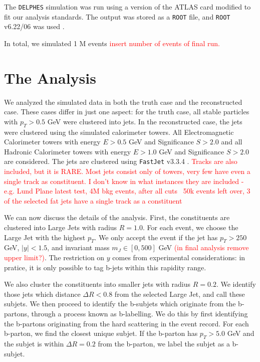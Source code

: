 \documentclass[10pt,a4paper]{book}
\newcommand\todo[1]{\textcolor{red}{#1}}
\def\code#1{\texttt{#1}}
\begin{document}
The \code{DELPHES} simulation was run using a version of the ATLAS card modified to fit our analysis standards. The output was stored as a \code{ROOT} file, and \code{ROOT} v6.22/06 was used \cite{fons_rademakers_2020_3895852}. 

In total, we simulated 1 M events \todo{insert number of events of final run.}


\section{The Analysis}

We analyzed the simulated data in both the truth case and the reconstructed case. These cases differ in just one aspect: for the truth case, all stable particles with $p_T > 0.5$ GeV were clustered into jets. In the reconstructed case, the jets were clustered using the simulated calorimeter towers. All Electromagnetic Calorimeter towers with energy $E > 0.5$ GeV and Significance $S > 2.0$ and all Hadronic Calorimeter towers with energy $E > 1.0$ GeV and Significance $S > 2.0$ are considered. The jets are clustered using \code{FastJet} v3.3.4 \cite{Cacciari:2011ma}.
\todo{Tracks are also included, but it is RARE. Most jets consist only of towers, very few have even a single track as constituent. I don't know in what instances they are included - e.g. Lund Plane latest test, 4M bkg events, after all cuts ~50k events left over, 3 of the selected fat jets have a single track as a constituent}

We can now discuss the details of the analysis. First, the constituents are clustered into Large Jets with radius $R=1.0$.  For  each  event,  we  choose  the  Large  Jet  with  the highest $p_T$. We only accept the event if the jet has $p_T > 250$ GeV, $\vert y \vert < 1.5$, and invariant mass $m_J \in [0,500]$ GeV \todo{(in final analysis remove upper limit?)}. The restriction on $y$ comes from experimental considerations: in pratice, it is only possible to tag b-jets within this rapidity range.

We  also  cluster  the  constituents  into  smaller  jets with radius $R = 0.2$. We identify those jets which distance $\Delta R < 0.8$ from the selected Large Jet, and call these subjets. We then proceed to identify the b-subjets which originate from the b-partons, through a process known as b-labelling. We do this by first identifying the b-partons originating from the hard scattering in the event record. For each b-parton, we find the closest unique subjet. If the b-parton has $p_T > 5.0$ GeV and the subjet is within $\Delta R = 0.2$ from the b-parton, we label the subjet as a b-subjet. 
\end{document}
